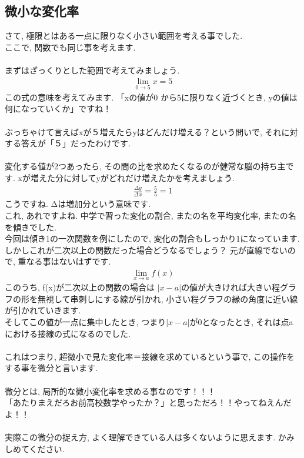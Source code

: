\documentclass[11pt,a4paper]{jreport}
\begin{document}
\subsection{微小な変化率}
さて, 極限とはある一点に限りなく小さい範囲を考える事でした.\\
ここで, 関数でも同じ事を考えます.\\
\\
まずはざっくりとした範囲で考えてみましょう.\\
\begin{eqnarray}
\lim_{0\to5} x = 5
\end{eqnarray}
この式の意味を考えてみます. 「xの値が0 から5に限りなく近づくとき, yの値は何になっていくか」ですね！\\
\\
ぶっちゃけて言えばxが５増えたらyはどんだけ増える？という問いで, それに対する答えが「５」だったわけです.\\
\\
変化する値が2つあったら, その間の比を求めたくなるのが健常な脳の持ち主です. xが増えた分に対してyがどれだけ増えたかを考えましょう.
\begin{eqnarray}
\frac{\Delta y}{\Delta x} = \frac{5}{5} = 1
\end{eqnarray}
こうですね. Δは増加分という意味です.\\
これ, あれですよね. 中学で習った変化の割合, またの名を平均変化率, またの名を傾きでした.\\
今回は傾き1の一次関数を例にしたので, 変化の割合もしっかり1になっています.\\
しかしこれが二次以上の関数だった場合どうなるでしょう？ 元が直線でないので, 重なる事はないはずです.\\
\begin{eqnarray}
\lim_{x \to a} f(x)
\end{eqnarray}
このうち, f(x)が二次以上の関数の場合は $|x-a|$の値が大きければ大きい程グラフの形を無視して串刺しにする線が引かれ, 小さい程グラフの縁の角度に近い線が引かれていきます.\\

そしてこの値が一点に集中したとき, つまり$|x-a|$が0となったとき, それは点aにおける接線の式になるのでした.\\
\\
これはつまり, 超微小で見た変化率＝接線を求めているという事で, この操作をする事を微分と言います.\\
\\
微分とは, 局所的な微小変化率を求める事なのです！！！\\
「あたりまえだろお前高校数学やったか？」と思っただろ！！やってねえんだよ！！\\
\\
実際この微分の捉え方, よく理解できている人は多くないように思えます. かみしめてください.
\end{document}
